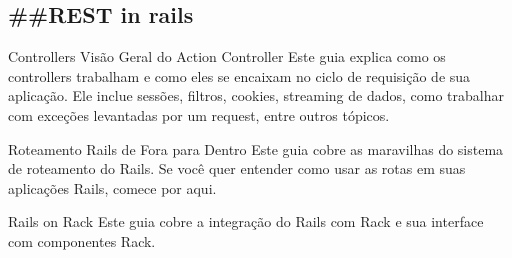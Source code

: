 \documentclass[serif,mathserif]{article}
\begin{document}
\subsection{\#\#REST in rails}



Controllers
Visão Geral do Action Controller
Este guia explica como os controllers trabalham e como eles se encaixam no ciclo de requisição de sua aplicação. Ele inclue sessões, filtros, cookies, streaming de dados, como trabalhar com exceções levantadas por um request, entre outros tópicos.

Roteamento Rails de Fora para Dentro
Este guia cobre as maravilhas do sistema de roteamento do Rails. Se você quer entender como usar as rotas em suas aplicações Rails, comece por aqui.

Rails on Rack
Este guia cobre a integração do Rails com Rack e sua interface com componentes Rack.
\end{document}
